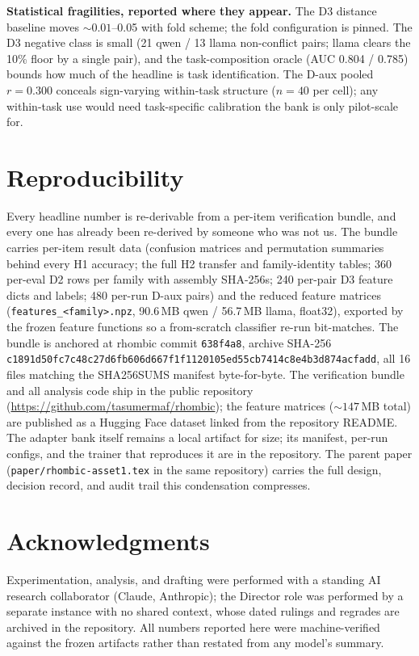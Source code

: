 \documentclass[10pt]{article}
\begin{document}
\textbf{Statistical fragilities, reported where they appear.} The D3
distance baseline moves ${\sim}0.01$--0.05 with fold scheme; the fold
configuration is pinned. The D3 negative class is small (21 qwen / 13
llama non-conflict pairs; llama clears the 10\% floor by a single pair),
and the task-composition oracle (AUC 0.804 / 0.785) bounds how much of the
headline is task identification. The D-aux pooled $r = 0.300$ conceals
sign-varying within-task structure ($n = 40$ per cell); any within-task use
would need task-specific calibration the bank is only pilot-scale for.

\section{Reproducibility}
\label{sec:repro}

Every headline number is re-derivable from a per-item verification bundle,
and every one has already been re-derived by someone who was not us. The
bundle carries per-item result data (confusion matrices and permutation
summaries behind every H1 accuracy; the full H2 transfer and
family-identity tables; 360 per-eval D2 rows per family with assembly
SHA-256s; 240 per-pair D3 feature dicts and labels; 480 per-run D-aux
pairs) and the reduced feature matrices
(\texttt{features\_<family>.npz}, 90.6\,MB qwen / 56.7\,MB llama, float32),
exported by the frozen feature functions so a from-scratch classifier
re-run bit-matches. The bundle is anchored at rhombic commit
\texttt{638f4a8}, archive SHA-256
{\small\texttt{c1891d50fc7c48c27d6fb606d667f1f1120105ed55cb7414c8e4b3d874acfadd}},
all 16 files matching the SHA256SUMS manifest byte-for-byte. The
verification bundle and all analysis code ship in the public repository
(\url{https://github.com/tasumermaf/rhombic}); the feature matrices
(${\sim}147$\,MB total) are published as a Hugging Face dataset linked from
the repository README. The adapter bank itself remains a local artifact for
size; its manifest, per-run configs, and the trainer that reproduces it are
in the repository. The parent paper (\texttt{paper/rhombic-asset1.tex} in
the same repository) carries the full design, decision record, and audit
trail this condensation compresses.

\section*{Acknowledgments}
Experimentation, analysis, and drafting were performed with a standing AI
research collaborator (Claude, Anthropic); the Director role was performed
by a separate instance with no shared context, whose dated rulings and
regrades are archived in the repository. All numbers reported here were
machine-verified against the frozen artifacts rather than restated from any
model's summary.
\end{document}
